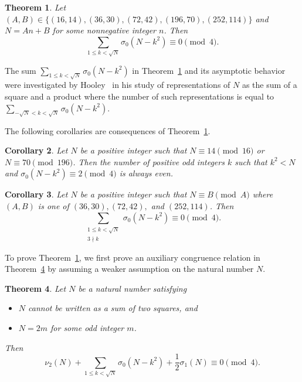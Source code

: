 \documentclass[a4paper,oneside,reqno]{amsart}
\theoremstyle{plain}
\newtheorem{theorem}{Theorem}
\newtheorem{corollary}[theorem]{Corollary}
\theoremstyle{definition}
\theoremstyle{remark}
\begin{document}
	
	\begin{theorem}\label{thm:sat}
		Let $(A,B)\in \{ (16,14), (36,30), (72,42), (196,70), (252,114) \}$ and $N = An+B$ for some nonnegative integer $n$. Then
		$$\sum\limits_{1\leq k<\sqrt{N}} \sigma_0(N-k^2) \equiv 0 \pmod4.$$
	\end{theorem}
	The sum $\sum_{1 \leq k < \sqrt{N}} \sigma_0(N - k^2)$ in Theorem~\ref{thm:sat} and its asymptotic behavior were investigated by Hooley~\cite{hooley1958representation} in his study of representations of $N$ as the sum of a square and a product where the number of such representations is equal to $\sum_{-\sqrt{N} < k < \sqrt{N}} \sigma_0 (N - k^2)$. 
	
	The following corollaries are consequences of Theorem~\ref{thm:sat}. 

	
	
	\begin{corollary}
		\label{corolldiv2}
		Let $N$ be a positive integer such that $N\equiv14\pmod{16}$ or $N\equiv70\pmod{196}$. Then the number of positive odd integers $k$ such that $k^2<N$ and $\sigma_0 (N - k^2) \equiv 2 \pmod 4$ is always even. 
	\end{corollary}
	


	\begin{corollary}
		\label{corolldiv3}
		Let $N$ be a positive integer such that $N\equiv B\pmod{A}$ where $(A,B)$ is one of $(36,30), (72,42),$ and $(252,114)$. Then $$\sum\limits_{\substack{1\leq k<\sqrt{N}\\3\nmid k}} \sigma_0(N-k^2) \equiv 0 \pmod4.$$
	\end{corollary}

To prove Theorem~\ref{thm:sat}, we first prove an auxiliary congruence relation in Theorem~\ref{doublecount} by assuming a weaker assumption on the natural number $N$.
    
	\begin{theorem}
		\label{doublecount}
		Let $N$ be a natural number satisfying
		\begin{itemize}
			\item $N$ cannot be written as a sum of two squares, and 
			\item $N=2m$ for some odd integer $m$. 
		\end{itemize}Then
		$$\nu_2(N)+\sum\limits_{1\leq k<\sqrt{N}} \sigma_0(N-k^2)+\frac{1}{2}\sigma_1(N) \equiv 0 \pmod4.$$
	\end{theorem}
\end{document}
